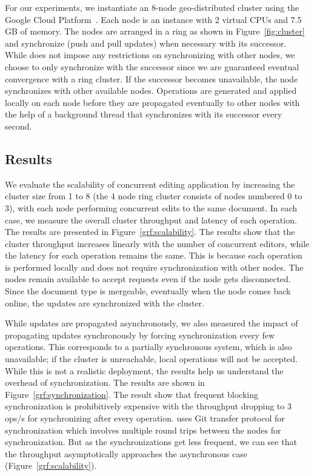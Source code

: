 For our experiments, we instantiate an 8-node geo-distributed cluster using the
Google Cloud Platform~\cite{gcp}. Each node is an  instance
with 2 virtual CPUs and 7.5 GB of memory. The nodes are arranged in a ring as
shown in Figure~\ref{fig:cluster} and synchronize (push and pull updates) when
necessary with its successor. While \name does not impose any restrictions on
synchronizing with other nodes, we choose to only synchronize with the
successor since we are guaranteed eventual convergence with a ring cluster. If
the successor becomes unavailable, the node synchronizes with other available
nodes. Operations are generated and applied locally on each node before they
are propagated eventually to other nodes with the help of a background thread
that synchronizes with its successor every second.

\subsection{Results}

We evaluate the scalability of concurrent editing application by increasing the
cluster size from 1 to 8 (the 4 node ring cluster consists of nodes numbered 0
to 3), with each node performing concurrent edits to the same document. In each
case, we measure the overall cluster throughput and latency of each operation.
The results are presented in Figure~\ref{grf:scalability}. The results show
that the cluster throughput increases linearly with the number of concurrent
editors, while the latency for each operation remains the same. This is because
each operation is performed locally and does not require synchronization with
other nodes. The nodes remain available to accept requests even if the node
gets disconnected. Since the document type is mergeable, eventually when the
node comes back online, the updates are synchronized with the cluster.

While updates are propagated asynchronously, we also measured the impact of
propagating updates synchronously by forcing synchronization every few
operations. This corresponds to a partially synchronous system, which is also
unavailable; if the cluster is unreachable, local operations will not be
accepted. While this is not a realistic deployment, the results help us
understand the overhead of synchronization. The results are shown in
Figure~\ref{grf:synchronization}. The result show that frequent blocking
synchronization is prohibitively expensive with the throughput dropping to 3
ops/s for synchronizing after every operation. \name uses Git transfer protocol
for synchronization which involves multiple round trips between the nodes for
synchronization. But as the synchronizations get less frequent, we can see that
the throughput asymptotically approaches the asynchronous case
(Figure~\ref{grf:scalability}).

